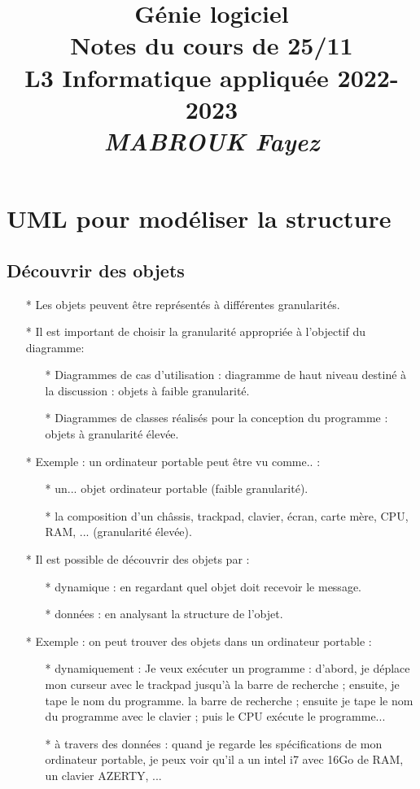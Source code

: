 \documentclass[12pt]{article}
\title{{\bf  Génie logiciel} \\
	Notes du cours de 25/11  \\
	{\small L3 Informatique appliquée 2022-2023} \\
	{\it \small MABROUK Fayez}}
\begin{document}
	\maketitle
	\newpage
	\section{UML pour modéliser la structure}
	\subsection{Découvrir des objets}
	\begin{itemize}
		\item[* ] Les objets peuvent être représentés à différentes granularités.
		\item[* ] Il est important de choisir la granularité appropriée à l'objectif du diagramme:
		\begin{itemize}
			\item[* ] Diagrammes de cas d'utilisation : diagramme de haut niveau destiné à la discussion : objets à faible granularité.
			\item[* ] Diagrammes de classes réalisés pour la conception du programme : objets à granularité élevée.
		\end{itemize}
	\item[* ] Exemple : un ordinateur portable peut être vu comme.. :
	\begin{itemize}
		\item[* ] un... objet ordinateur portable (faible granularité).
		\item[* ] la composition d'un châssis, trackpad, clavier, écran, carte mère, CPU, RAM, ...
		(granularité élevée).
	\end{itemize}
\item[* ] Il est possible de découvrir des objets par :
\begin{itemize}
	\item[* ] dynamique : en regardant quel objet doit recevoir le message.
	\item[* ] données : en analysant la structure de l'objet.
	
\end{itemize}
\item[* ] Exemple : on peut trouver des objets dans un ordinateur portable :
\begin{itemize}
	\item[* ] dynamiquement : Je veux exécuter un programme : d'abord, je déplace mon curseur avec le trackpad jusqu'à la barre de recherche ; ensuite, je tape le nom du programme.
	la barre de recherche ; ensuite je tape le nom du programme avec le clavier ; puis le CPU
	exécute le programme...
	\item[* ] à travers des données : quand je regarde les spécifications de mon ordinateur portable, je peux voir qu'il a un intel i7
	avec 16Go de RAM, un clavier AZERTY, ...
\end{itemize}
	\end{itemize}
\end{document}
